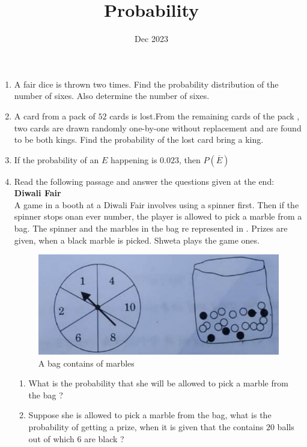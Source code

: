 \documentclass[12pt,-letter paper]{article}
\title{Probability}
\date{Dec 2023}
\begin{document}
\maketitle
\begin{enumerate}

\item A fair dice is thrown two times. Find the probability distribution of the number of sixes. Also determine the number of sixes.

\item A card from a pack of $52$ cards is lost.From the remaining cards of the pack , two cards are drawn randomly one-by-one without replacement and are found to be both kings. Find the probability of the lost card bring a king.

\item If the probability of an $E$ happening is $0.023$, then $P(\overline{E})$

\item Read the following passage and answer the questions given at the end:\\
\textbf{Diwali Fair}\\
		A game in a booth at a Diwali Fair involves using a spinner first. Then if the spinner stops onan ever number, the player is allowed to pick a marble from a bag. The spinner and the marbles in the bag re represented in .
Prizes are given, when a black marble is picked. Shweta plays the game ones.
		\begin{figure}[H]
			\centering
			\includegraphics[width=0.5\columnwidth]{figs/Probability.jpg}
			\caption{A bag contains of marbles}
			\label{fig:31.jpg}
		\end{figure}
\begin{enumerate}
	\item What is the probability that she will be allowed to pick a marble from the bag ?

	\item Suppose she is allowed to pick a marble from the bag, what is the probability of getting a prize, when it is given that the contains $20$ balls out of which $6$ are black ?
\end{enumerate}
\end{enumerate}
\end{document}
